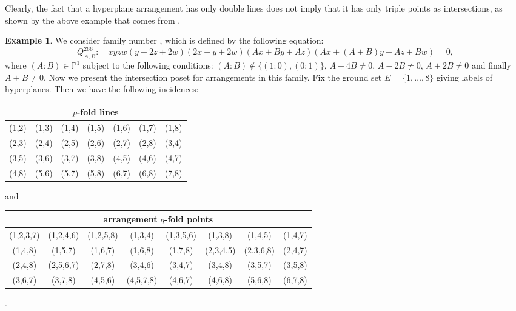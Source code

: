 \documentclass[11pt]{article}
\theoremstyle{plain}
\theoremstyle{definition}
\newtheorem{example}[thm]{Example}
\begin{document}
Clearly, the fact that a hyperplane arrangement has only double lines does not imply that it has only triple points as intersections, as shown by the above example that comes from \cite{Cynks}.
\begin{example}
We consider family number , which is defined by the following equation:
\[Q_{A,B}^{266}: \quad xyzw(y-2z+2w)(2x+y+2w)(Ax+By+Az)(Ax+(A+B)y-Az+Bw) = 0,\]
where $(A:B) \in \mathbb{P}^{1}$ subject to the following conditions: $(A:B) \not\in \{(1:0),(0:1)\}$, $A+4B\neq 0$, $A-2B\neq 0$, $A+2B\neq 0$ and finally $A+B\neq 0$.
Now we present the intersection poset for arrangements in this family. Fix the ground set $E= \{1, \ldots , 8\}$ giving labels of hyperplanes. Then we have the following incidences:
\begin{center}
\begin{tabular}{ c c c c c c c }
\multicolumn{7}{c}{$p$-fold lines} \\\hline \hline
 (1,2) & (1,3) & (1,4) & (1,5) & (1,6) & (1,7) & (1,8) \\
 (2,3) & (2,4) & (2,5) & (2,6) & (2,7) & (2,8) & (3,4) \\
 (3,5) & (3,6) & (3,7) & (3,8) & (4,5) & (4,6) & (4,7) \\
 (4,8) & (5,6) & (5,7) & (5,8) & (6,7) & (6,8) & (7,8) \\ 
\end{tabular}
\end{center}
and 
\begin{center}
\begin{tabular}{ c c c c c c c c }
\multicolumn{8}{c}{arrangement $q$-fold points} \\ \hline \hline 
(1,2,3,7) & (1,2,4,6) & (1,2,5,8) & (1,3,4) & (1,3,5,6) & (1,3,8) & (1,4,5) & (1,4,7) \\
 (1,4,8)  &  (1,5,7)  &  (1,6,7) &  (1,6,8) &  (1,7,8) &  (2,3,4,5) &  (2,3,6,8) &  (2,4,7) \\
 (2,4,8)  & (2,5,6,7) &  (2,7,8) &  (3,4,6) &  (3,4,7) &  (3,4,8) &  (3,5,7)  &  (3,5,8) \\
 (3,6,7)  &  (3,7,8)  &  (4,5,6) &  (4,5,7,8) &  (4,6,7) & (4,6,8) &  (5,6,8) & (6,7,8)
\end{tabular}.
\end{center}
\end{example}
\end{document}
